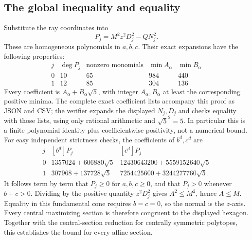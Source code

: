 \subsection{The global inequality and equality}
Substitute the ray coordinates into
\[
 P_j=M^2 z^2D_j^2-QN_j^2.
\]
These are homogeneous polynomials in $a,b,c$. Their exact expansions
have the following properties:
\[
\begin{array}{c|c|c|c|c}
 j&\deg P_j&\text{nonzero monomials}
 &\min A_\alpha&\min B_\alpha\\\hline
0&10&65&984&440\\
1&12&85&304&136
\end{array}
\]
Every coefficient is $A_\alpha+B_\alpha\sqrt5$, with integer
$A_\alpha,B_\alpha$ at least the corresponding positive minima.
The complete exact coefficient lists accompany this proof as JSON and
CSV; the verifier expands the displayed $N_j,D_j$ and checks equality
with those lists, using only rational arithmetic and $\sqrt5^2=5$.
In particular this is a finite polynomial identity plus coefficientwise
positivity, not a numerical bound. For easy independent strictness
checks, the coefficients of $b^d,c^d$ are
\[
\begin{array}{c|r|r}
j&[b^d]P_j&[c^d]P_j\\\hline
0&1357024+606880\sqrt5&12430643200+5559152640\sqrt5\\
1&307968+137728\sqrt5&7254425600+3244277760\sqrt5.
\end{array}
\]
It follows term by term that $P_j\ge0$ for $a,b,c\ge0$, and that
$P_j>0$ whenever $b+c>0$. Dividing by the positive quantity $z^2D_j^2$
gives $A^2\le M^2$, hence $A\le M$. Equality in this fundamental cone
requires $b=c=0$, so the normal is the $z$-axis. Every central maximizing
section is therefore congruent to the displayed hexagon. Together with
the central-section reduction for centrally symmetric polytopes, this
establishes the bound for every affine section.

